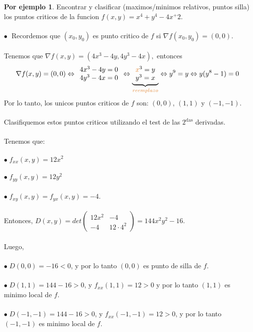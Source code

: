 \documentclass{article}
\theoremstyle{definition}
\newtheorem*{ej}{Por ejemplo}
\theoremstyle{remark}
\newcommand\bl{$\bullet\;$}
\begin{document}
\begin{ej}
  Encontrar y clasificar (maximos/minimos relativos, puntos silla) los puntos criticos de la funcion \mbox{$f(x,y)=x^4+y^4-4x^+2$}. \\\\
  \textcolor{azulp2}{\bl} Recordemos que $(x_0,y_0)$ es punto critico de $f$ si $\nabla f (x_0,y_0) =(0,0)$. \\\\ Tenemos que $\nabla f(x,y)=(4x^3-4y,4y^3-4x),$ entonces \[ 
    \nabla f(x,y)=(0,0) \Leftrightarrow \begin{array}{l}
4x^3-4y=0 \\
4y^3-4x=0
\end{array} \Leftrightarrow \underbrace{\begin{array}{l}
  \textcolor{rojop2}{x}^3=y \\
y^3 = x
\end{array}}_{\textcolor{rojop2}{reemplazo}} \Leftrightarrow y^9=y \Leftrightarrow y(y^8-1)=0 
  \] Por lo tanto, los unicos puntos criticos de $f$ son: $(0,0)$, $(1,1)$ y $(-1,-1)$. \\ \pagebreak \\
  Clasifiquemos estos puntos criticos utilizando el test de las $2^{\text{das}}$ derivadas.\\\\ Tenemos que: \\\\
  \bl $f_{xx}(x,y)=12x^2$ \\\\
  \bl $f_{yy}(x,y)=12y^2$ \\\\
  \bl $f_{xy}(x,y)=f_{yx}(x,y)=-4$. \\\\
  Entonces, $D(x,y)=det\left(\begin{array}{cc}
      12x^2 & -4 \\ 
      -4 & 12\cdot 4^2
  \end{array}\right)=144x^2y^2-16$.\\\\
  Luego, \\\\
  \bl $D(0,0)=-16<0$, y por lo tanto $(0,0)$ es punto de silla de $f$. \\\\
  \bl $D(1,1)=144-16>0$, y $f_{xx}(1,1)=12>0$ y por lo tanto $(1,1)$ es minimo local de $f$. \\\\
  \bl $D(-1,-1)=144-16>0$, y $f_{xx}(-1,-1)=12>0$, y por lo tanto $(-1,-1)$ es minimo local de $f$.
\end{ej}\pagebreak
\end{document}

